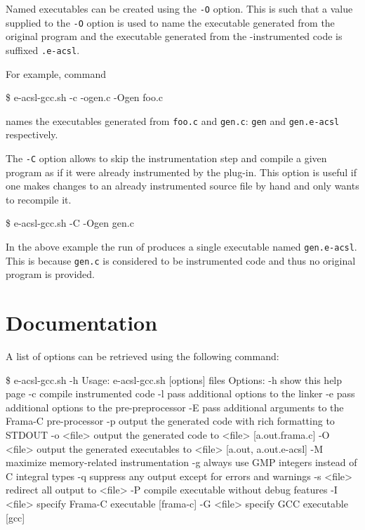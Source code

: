 Named executables can be created using the \texttt{-O} option.  This is such
that a value supplied to the \texttt{-O} option is used to name the executable
generated from the original program and the executable generated from the
\eacsl-instrumented code is suffixed \texttt{.e-acsl}.

For example, command
\begin{shell}
 \$ e-acsl-gcc.sh -c -ogen.c -Ogen foo.c
\end{shell}
names the executables generated from \texttt{foo.c} and \texttt{gen.c}:
\texttt{gen} and \texttt{gen.e-acsl} respectively.

The \eacslgcc \texttt{-C} option allows to skip the instrumentation step and
compile a given program as if it were already instrumented by the \eacsl
plug-in.  This option is useful if one makes changes to an already
instrumented source file by hand and only wants to recompile it.

\begin{shell}
 \$ e-acsl-gcc.sh -C -Ogen gen.c
\end{shell}

In the above example the run of \eacslgcc produces a single executable named
\texttt{gen.e-acsl}. This is because \texttt{gen.c} is considered to be
instrumented code and thus no original program is provided.


\section{Documentation}

A list of \eacslgcc options can be retrieved using the following command:

\begin{shell}
 \$ e-acsl-gcc.sh -h
 Usage: e-acsl-gcc.sh [options] files
 Options:
   -h         show this help page
   -c         compile instrumented code
   -l         pass additional options to the linker
   -e         pass additional options to the pre-preprocessor
   -E         pass additional arguments to the Frama-C pre-processor
   -p         output the generated code with rich formatting to STDOUT
   -o <file>  output the generated code to <file> [a.out.frama.c]
   -O <file>  output the generated executables to <file> [a.out, a.out.e-acsl]
   -M         maximize memory-related instrumentation
   -g         always use GMP integers instead of C integral types
   -q         suppress any output except for errors and warnings
   -s <file>  redirect all output to <file>
   -P         compile executable without debug features
   -I <file>  specify Frama-C executable [frama-c]
   -G <file>  specify GCC executable [gcc]
\end{shell}

